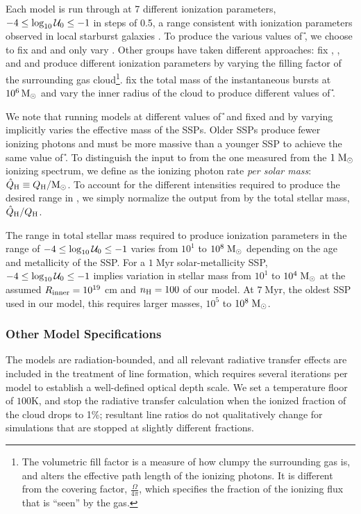 Each model is run through \Cloudy at 7 different ionization parameters, $-4 \leq \log_{10} \mathcal{U}_0 \leq -1$ in steps of 0.5, a range consistent with ionization parameters observed in local starburst galaxies \citep{Rigby04}. To produce the various values of \U{}, we choose to fix \Rin{} and \nH{} and only vary \QH{}. Other groups have taken different approaches: \citet{Moy01} fix \Rin{}, \nH{}, and \QH{} and produce different ionization parameters by varying the filling factor of the surrounding gas cloud\footnote{The volumetric fill factor is a measure of how clumpy the surrounding gas is, and alters the effective path length of the ionizing photons. It is different from the covering factor, $\frac{\Omega}{4\pi}$, which specifies the fraction of the ionizing flux that is ``seen'' by the gas.}. \citet{Levesque10} fix the total mass of the instantaneous bursts at $10^6\,\mathrm{M_{\odot}}$ and vary the inner radius of the cloud to produce different values of \U{}.

We note that running models at different values of \U{} and fixed \Rin{} and \nH{} by varying \QH{} implicitly varies the effective mass of the SSPs. Older SSPs produce fewer ionizing photons and must be more massive than a younger SSP to achieve the same value of \U{}. To distinguish the \QH{} input to \Cloudy from the one measured from the $1\;\mathrm{M_{\odot}}$ ionizing spectrum, we define \QHat{} as the ionizing photon rate \emph{per solar mass}: $\hat{Q}_{\mathrm{H}} \equiv Q_{\mathrm{H}}/\mathrm{M_{\odot}}$. To account for the different intensities required to produce the desired range in \logU{}, we simply normalize the output from \Cloudy by the total stellar mass, $\hat{Q}_{\mathrm{H}}/Q_{\mathrm{H}}$. 

The range in total stellar mass required to produce ionization parameters in the range of $-4 \leq \log_{10} \mathcal{U}_0 \leq -1$ varies from $10^1$ to $10^8\;\mathrm{M_{\odot}}$ depending on the age and metallicity of the SSP. For a $1\;$Myr solar-metallicity SSP, $-4 \leq \log_{10} \mathcal{U}_0 \leq -1$ implies variation in stellar mass from $10^1$ to $10^4\;\mathrm{M_{\odot}}$ at the assumed $R_{\mathrm{inner}}{} = 10^{19}$ cm and $n_{\mathrm{H}}=100$  of our model. At $7\;$Myr, the oldest SSP used in our model, this requires larger masses, $10^5$ to $10^8\;\mathrm{M_{\odot}}$.

\subsubsection{Other Model Specifications}\label{sec:methods:cloudy:other}

The \Cloudy models are radiation-bounded, and all relevant radiative transfer effects are included in the treatment of line formation, which requires several iterations per model to establish a well-defined optical depth scale. We set a temperature floor of $100$K, and stop the radiative transfer calculation when the ionized fraction of the cloud drops to 1\%; resultant line ratios do not qualitatively change for simulations that are stopped at slightly different fractions.

